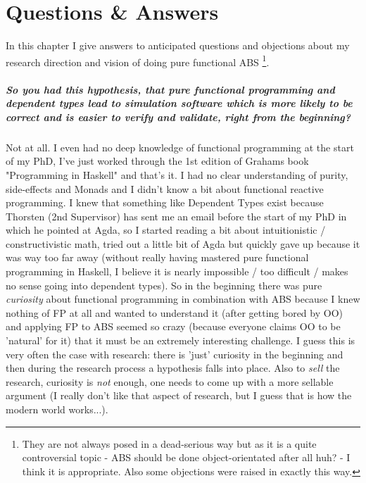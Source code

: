 \chapter{Questions \& Answers}
\label{chap:qa}

In this chapter I give answers to anticipated questions and objections about my research direction and vision of doing pure functional ABS \footnote{They are not always posed in a dead-serious way but as it is a quite controversial topic - ABS should be done object-orientated after all huh? - I think it is appropriate. Also some objections were raised in exactly this way.}.

\paragraph{So you had this hypothesis, that pure functional programming and dependent types lead to simulation software which is more likely to be correct and is easier to verify and validate, right from the beginning?}
Not at all. I even had no deep knowledge of functional programming at the start of my PhD, I've just worked through the 1st edition of Grahams book "Programming in Haskell" and that's it. I had no clear understanding of purity, side-effects and Monads and I didn't know a bit about functional reactive programming. I knew that something like Dependent Types exist because Thorsten (2nd Supervisor) has sent me an email before the start of my PhD in which he pointed at Agda, so I started reading a bit about intuitionistic / constructivistic math, tried out a little bit of Agda but quickly gave up because it was way too far away (without really having mastered pure functional programming in Haskell, I believe it is nearly impossible / too difficult / makes no sense going into dependent types).
So in the beginning there was pure \textit{curiosity} about functional programming in combination with ABS because I knew nothing of FP at all and wanted to understand it (after getting bored by OO) and applying FP to ABS seemed so crazy (because everyone claims OO to be 'natural' for it) that it must be an extremely interesting challenge. I guess this is very often the case with research: there is 'just' curiosity in the beginning and then during the research process a hypothesis falls into place. Also to \textit{sell} the research, curiosity is \textit{not} enough, one needs to come up with a more sellable argument (I really don't like that aspect of research, but I guess that is how the modern world works...).

